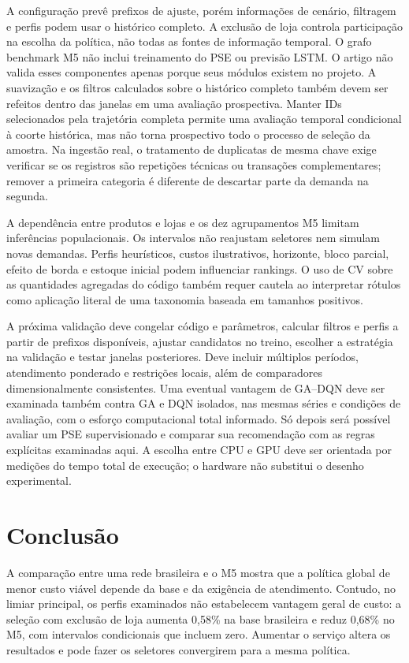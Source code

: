 \documentclass[preprint,12pt]{elsarticle}
\begin{document}
A configuração prevê prefixos de ajuste, porém informações de cenário, filtragem e perfis podem usar o histórico completo. A exclusão de loja controla participação na escolha da política, não todas as fontes de informação temporal. O grafo benchmark M5 não inclui treinamento do PSE ou previsão LSTM. O artigo não valida esses componentes apenas porque seus módulos existem no projeto. A suavização e os filtros calculados sobre o histórico completo também devem ser refeitos dentro das janelas em uma avaliação prospectiva. Manter IDs selecionados pela trajetória completa permite uma avaliação temporal condicional à coorte histórica, mas não torna prospectivo todo o processo de seleção da amostra. Na ingestão real, o tratamento de duplicatas de mesma chave exige verificar se os registros são repetições técnicas ou transações complementares; remover a primeira categoria é diferente de descartar parte da demanda na segunda.

A dependência entre produtos e lojas e os dez agrupamentos M5 limitam inferências populacionais. Os intervalos não reajustam seletores nem simulam novas demandas. Perfis heurísticos, custos ilustrativos, horizonte, bloco parcial, efeito de borda e estoque inicial podem influenciar rankings. O uso de CV sobre as quantidades agregadas do código também requer cautela ao interpretar rótulos como aplicação literal de uma taxonomia baseada em tamanhos positivos.

A próxima validação deve congelar código e parâmetros, calcular filtros e perfis a partir de prefixos disponíveis, ajustar candidatos no treino, escolher a estratégia na validação e testar janelas posteriores. Deve incluir múltiplos períodos, atendimento ponderado e restrições locais, além de comparadores dimensionalmente consistentes. Uma eventual vantagem de GA--DQN deve ser examinada também contra GA e DQN isolados, nas mesmas séries e condições de avaliação, com o esforço computacional total informado. Só depois será possível avaliar um PSE supervisionado e comparar sua recomendação com as regras explícitas examinadas aqui. A escolha entre CPU e GPU deve ser orientada por medições do tempo total de execução; o hardware não substitui o desenho experimental.

\section{Conclusão}
A comparação entre uma rede brasileira e o M5 mostra que a política global de menor custo viável depende da base e da exigência de atendimento. Contudo, no limiar principal, os perfis examinados não estabelecem vantagem geral de custo: a seleção com exclusão de loja aumenta 0,58\% na base brasileira e reduz 0,68\% no M5, com intervalos condicionais que incluem zero. Aumentar o serviço altera os resultados e pode fazer os seletores convergirem para a mesma política.
\end{document}

